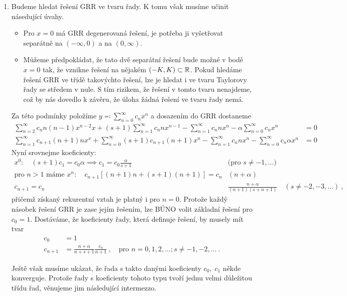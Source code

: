 \begin{enumerate}
\item Budeme hledat řešení GRR ve tvaru řady. K tomu však musíme učinit násedující úvahy.
    \begin{itemize}
        \item  Pro $x=0$ má GRR degenerovaná řešení, je potřeba ji vyšetřovat separátně na $(-\infty,0)$ a na $(0,\infty)$.
        \item Můžeme předpokládat, že tato dvě separátní řešení bude možné  v bodě $x=0$ tak, že vznikne řešení na nějakém $(-K,K)\subset \mathbb{R}$. Pokud hledáme řešení GRR ve třídě takovýchto  řešení, lze je hledat i ve tvaru Taylorovy řady se středem v nule. S tím rizikem, že řešení v tomto tvaru nenajdeme, což by nás dovedlo k závěru, že úloha žádná  řešení ve tvaru řady nemá.
    \end{itemize}
Za této podmínky položíme $y\eqqcolon \sum\limits_{n=0}^\infty c_nx^n$ a dosazením do GRR dostaneme
\begin{align*}
    \sum\limits_{n=2}^\infty c_nn(n-1)x^{n-2}x + (s+1)\sum\limits_{n=1}^\infty c_n nx^{n-1}-\sum\limits_{n=1}^\infty c_nnx^n-\alpha\sum\limits_{n=0}^\infty c_nx^n&=0\\
    \sum\limits_{n=1}^\infty c_{n+1}(n+1)nx^x + \sum\limits_{n=0}^\infty (s+1)c_{n+1} (n+1)x^n-\sum\limits_{n=1}^\infty c_nnx^n-\sum\limits_{n=0}^\infty c_n\alpha x^n&=0
\end{align*}
Nyní srovnejme koeficienty:
\begin{align*}
    x^0:\quad (s+1)c_1=c_0\alpha \implies c_1=c_0\frac{\alpha}{s+1} \quad &\text{(pro }s\neq-1,\dots\text{)}\\
    \text{pro }n>1\text{ máme } x^n:\quad c_{n+1}\left[(n+1)n+(s+1)(n+1) \right] = c_n&(n+\alpha) \\
    c_{n+1}=c_n&\frac{n+\alpha}{(n+1)(s+n+1)} \quad(s\neq-2,-3,\dots)\:,
\end{align*}
přičemž získaný rekurentní vztah je platný i pro $n=0$. Protože každý násobek řešení GRR je zase jejím řešením, lze BÚNO volit základní řešení pro $c_0=1$. Dostáváme, že koeficienty řady, která definuje řešení, by musely mít tvar
\begin{align*}
    c_0&=1\\
    c_{n+1}&=\frac{n+\alpha}{n+s+1}\frac{c_n}{n+1}\:,\quad \text{pro } n=0,1,2,\dots; s\neq-1,-2,\dots \:.
\end{align*}

Ještě však musíme ukázat, že řada s takto danými koeficienty $c_0,\;c_1$ někde konverguje. Protože řady s koeficienty tohoto typu tvoří jednu velmi důležitou třídu řad, věnujeme jim následující intermezzo.


\end{enumerate}


